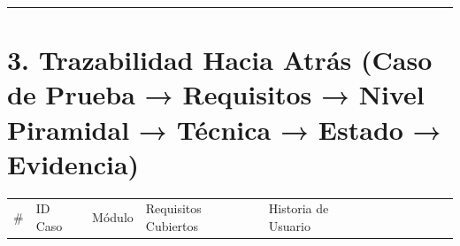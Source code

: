 \documentclass[10pt,a4paper]{article}
\newcounter{none}
\begin{document}
\endgroup\medskip

\begin{center}\rule{0.5\linewidth}{0.5pt}\end{center}


\section{3. Trazabilidad Hacia Atrás (Caso de Prueba → Requisitos → Nivel Piramidal → Técnica → Estado → Evidencia)}\label{3-trazabilidad-hacia-atruxe1s-caso-de-prueba--requisitos--nivel-piramidal--tuxe9cnica--estado--evidencia}

\begingroup\singlespacing\scriptsize\setlength{\parskip}{0pt}

{\def\LTcaptype{none} %
\begin{longtable}[]{@{}
  >{\raggedright\arraybackslash}p{}
  >{\raggedright\arraybackslash}p{}
  >{\raggedright\arraybackslash}p{}
  >{\raggedright\arraybackslash}p{}
  >{\raggedright\arraybackslash}p{}
  >{\raggedright\arraybackslash}p{}
  >{\raggedright\arraybackslash}p{}
  >{\raggedright\arraybackslash}p{}
  >{\raggedright\arraybackslash}p{}
  >{\raggedright\arraybackslash}p{}
  >{\raggedright\arraybackslash}p{}@{}}
\toprule\noalign{}
\begin{minipage}[b]{\linewidth}\raggedright
\#
\end{minipage} & \begin{minipage}[b]{\linewidth}\raggedright
ID Caso
\end{minipage} & \begin{minipage}[b]{\linewidth}\raggedright
Módulo
\end{minipage} & \begin{minipage}[b]{\linewidth}\raggedright
Requisitos Cubiertos
\end{minipage} & \begin{minipage}[b]{\linewidth}\raggedright
Historia de Usuario
\end{minipage} & \begin{minipage}[b]{\linewidth}\raggedright

\end{minipage}
\end{longtable}}
\end{document}
